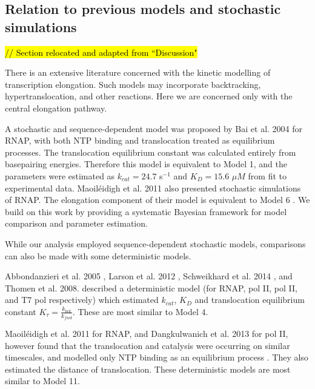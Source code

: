 \documentclass[10pt,letterpaper]{article}
\begin{document}
\subsection*{Relation to previous models and stochastic simulations}


\textcolor{red}{\hl{// Section relocated and adapted from ``Discussion" }}

There is an extensive literature concerned with the kinetic modelling of transcription elongation. Such models may incorporate backtracking, hypertranslocation, and other reactions. Here we are concerned only with the central elongation pathway.


A stochastic and sequence-dependent model  was proposed by Bai et al. 2004 \cite{bai2004sequence} for RNAP, with both NTP binding and translocation treated as equilibrium processes. The translocation equilibrium constant was calculated entirely from basepairing energies. Therefore this model is equivalent to Model 1, and the parameters were estimated as $k_{cat} = 24.7$ s$^{-1}$ and $K_D = 15.6$ $\mu M$ from fit to experimental data. Maoil{\'e}idigh et al. 2011 also presented stochastic simulations of RNAP. The elongation component of their model is equivalent to Model 6 \cite{maoileidigh2011unified}. We build on this work by providing a systematic Bayesian framework for model comparison and parameter estimation.   \par

While our analysis employed sequence-dependent stochastic models, comparisons can also be made with some deterministic models.


Abbondanzieri et al. 2005 \cite{abbondanzieri2005direct}, Larson et al. 2012 \cite{larson2012trigger} , Schweikhard et al. 2014 \cite{schweikhard2014transcription}, and Thomen et al. 2008. \cite{thomen2008t7, thomen2005unravelling}  described a deterministic model (for RNAP, pol II, pol II, and T7 pol respectively) which estimated $k_{cat}$, $K_D$ and translocation equilibrium constant $K_\tau = \frac{k_{bck}}{k_{fwd}}$. These are most similar to Model 4.




Maoil{\'e}idigh et al. 2011 for RNAP, and Dangkulwanich et al. 2013 for pol II, however found that the translocation and catalysis were occurring on similar timescales, and modelled only NTP binding as an equilibrium process  \cite{maoileidigh2011unified, Dangkulwanich2013complete}. They also estimated the distance of translocation. These deterministic models are most similar to Model 11.
\end{document}
